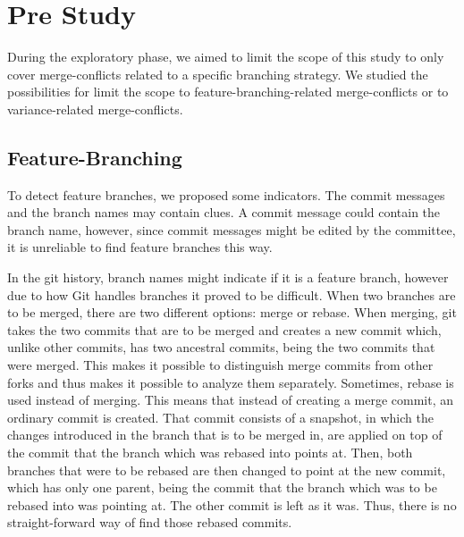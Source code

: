 \chapter{Pre Study}
During the exploratory phase, we aimed to limit the scope of this study to only cover merge-conflicts related to a specific branching strategy. We studied the possibilities for limit the scope to feature-branching-related merge-conflicts or to variance-related merge-conflicts.
\section{Feature-Branching}
To detect feature branches, we proposed some indicators. The commit messages and the branch names may contain clues. A commit message could contain the branch name, however, since commit messages might be edited by the committee, it is unreliable to find feature branches this way.

In the git history, branch names might indicate if it is a feature branch, however due to how Git handles branches it proved to be difficult. When two branches are to be merged, there are two different options: merge or rebase. When merging, git takes the two commits that are to be merged and creates a new commit which, unlike other commits, has two ancestral commits, being the two commits that were merged. This makes it possible to distinguish merge commits from other forks and thus makes it possible to analyze them separately. Sometimes, rebase is used instead of merging. This means that instead of creating a merge commit, an ordinary commit is created. That commit consists of a snapshot, in which the changes introduced in the branch that is to be merged in, are applied on top of the commit that the branch which was rebased into points at. Then, both branches that were to be rebased are then changed to point at the new commit, which has only one parent, being the commit that the branch which was to be rebased into was pointing at. The other commit is left as it was. Thus, there is no straight-forward way of find those rebased commits.

